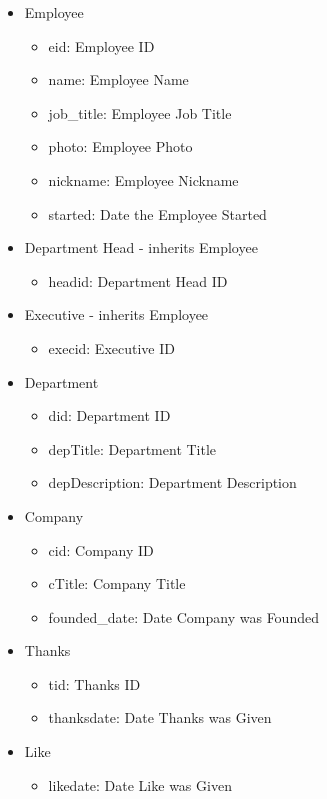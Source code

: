 \documentclass[11pt]{report}
\begin{document}
\begin{itemize}
\item Employee
    \begin{itemize}
    \item eid: Employee ID
    \item name: Employee Name
    \item job\_title: Employee Job Title
    \item photo: Employee Photo
    \item nickname: Employee Nickname
    \item started: Date the Employee Started
    \end{itemize}
\item Department Head - inherits Employee
    \begin{itemize}
    \item headid: Department Head ID
    \end{itemize}
\item Executive - inherits Employee
    \begin{itemize}
    \item execid: Executive ID
    \end{itemize}
\item Department
    \begin{itemize}
    \item did: Department ID
    \item depTitle: Department Title
    \item depDescription: Department Description
    \end{itemize}
\item Company
    \begin{itemize}
    \item cid: Company ID
    \item cTitle: Company Title
    \item founded\_date: Date Company was Founded
    \end{itemize}
\item Thanks
    \begin{itemize}
    \item tid: Thanks ID
    \item thanksdate: Date Thanks was Given
    \end{itemize}
\item Like
    \begin{itemize}
    \item likedate: Date Like was Given
    \end{itemize}

\end{itemize}
\end{document}
